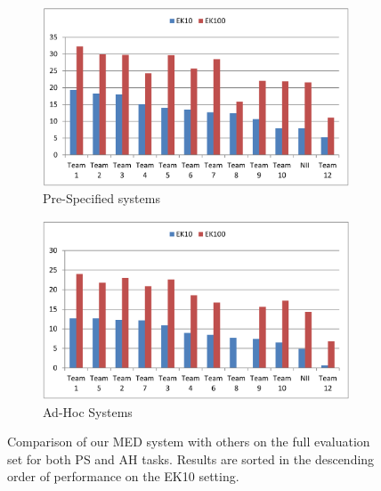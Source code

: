 \begin{figure}
	\centering
	\begin{subfigure}{\textwidth}
		\centering
		\includegraphics[width=1\linewidth]{med_result_ps.pdf}
		\caption{Pre-Specified systems}
		\label{fig_result_ps}
	\end{subfigure} 
	\begin{subfigure}{\textwidth}
		\centering
		\includegraphics[width=1\linewidth]{med_result_ah.pdf}
		\caption{Ad-Hoc Systems}
		\label{fig_result_ah}
	\end{subfigure}
	\caption{Comparison of our MED system with others on the full evaluation set for both PS and AH tasks. Results are sorted in the descending order of performance on the EK10 setting.}
	\label{fig:results}
\end{figure}



